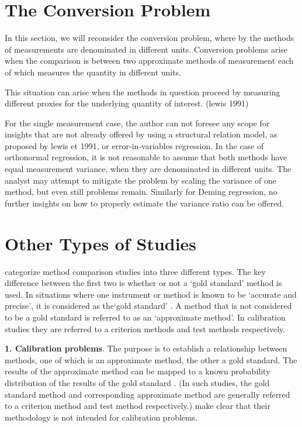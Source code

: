 \documentclass[MAIN.tex]{subfiles}
\begin{document}
	\section{The Conversion Problem}
	
	In this section, we will reconsider the conversion problem, where by the methods of measurements are denominated in different units.
	Conversion problems arise when the comparison is between two 
	approximate methods of measurement each of which measures the quantity in different units.
	
	This situation can arise when the methods in question proceed by measuring different proxies for the underlying 
	quantity of interest. (lewis 1991)
	
	For the single measurement case, the author can not foresee any scope for insights that are not already offered by using a structural relation model, as proposed by lewis et 1991, or error-in-variables regression. 
	In the case of orthonormal regression, it is not reasonable to assume that both methods have equal measurement variance, when they are denominated in different units.
	The analyst may attempt to mitigate the problem by scaling the variance of one method, but even still problems remain.
	Similarly for Deming regression, no further insights on how to properly estimate the variance ratio can be offered.
	
	

	
	\section{Other Types of Studies}
	\citet{lewis} categorize method comparison studies into three
	different types.  The key difference between the first two is
	whether or not a `gold standard' method is used. In situations
	where one instrument or method is known to be `accurate and
	precise', it is considered as the`gold standard' \citep{lewis}. A
	method that is not considered to be a gold standard is referred to
	as an `approximate method'. In calibration studies they are
	referred to a criterion methods and test methods respectively.
	
	
	\textbf{1. Calibration problems}. The purpose is to establish a
	relationship between methods, one of which is an approximate
	method, the other a gold standard. The results of the approximate
	method can be mapped to a known probability distribution of the
	results of the gold standard \citep{lewis}. (In such studies, the
	gold standard method and corresponding approximate method are
	generally referred to a criterion method and test method
	respectively.) \citet*{BA83} make clear that their methodology is
	not intended for calibration problems.
	
\end{document}

